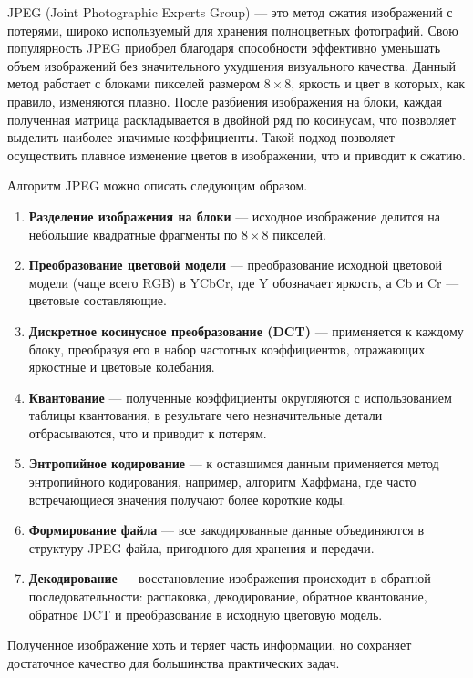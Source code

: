 JPEG (Joint Photographic Experts Group) \cite{JPEG} --- это метод сжатия изображений с потерями, широко используемый для хранения полноцветных фотографий. Свою популярность JPEG приобрел благодаря способности эффективно уменьшать объем изображений без значительного ухудшения визуального качества. Данный метод работает с блоками пикселей размером $8 \times 8$, яркость и цвет в которых, как правило, изменяются плавно. После разбиения изображения на блоки, каждая полученная матрица раскладывается в двойной ряд по косинусам, что позволяет выделить наиболее значимые коэффициенты. Такой подход позволяет осуществить плавное изменение цветов в изображении, что и приводит к сжатию.

Алгоритм JPEG можно описать следующим образом.
\begin{enumerate}
    \item \textbf{Разделение изображения на блоки} --- исходное изображение делится на небольшие квадратные фрагменты по $8 \times 8$ пикселей.
    \item \textbf{Преобразование цветовой модели} --- преобразование исходной цветовой модели (чаще всего RGB) в YCbCr, где Y обозначает яркость, а Cb и Cr --- цветовые составляющие.
    \item \textbf{Дискретное косинусное преобразование (DCT)} --- применяется к каждому блоку, преобразуя его в набор частотных коэффициентов, отражающих яркостные и цветовые колебания.
    \item \textbf{Квантование} --- полученные коэффициенты округляются с использованием таблицы квантования, в результате чего незначительные детали отбрасываются, что и приводит к потерям.
    \item \textbf{Энтропийное кодирование} --- к оставшимся данным применяется метод энтропийного кодирования, например, алгоритм Хаффмана, где часто встречающиеся значения получают более короткие коды.
    \item \textbf{Формирование файла} --- все закодированные данные объединяются в структуру JPEG-файла, пригодного для хранения и передачи.
    \item \textbf{Декодирование} --- восстановление изображения происходит в обратной последовательности: распаковка, декодирование, обратное квантование, обратное DCT и преобразование в исходную цветовую модель.
\end{enumerate}

Полученное изображение хоть и теряет часть информации, но сохраняет достаточное качество для большинства практических задач.


